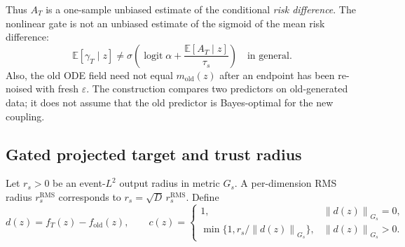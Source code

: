 \documentclass[11pt,a4paper]{article}
\newcommand{\E}{\mathbb{E}}
\newcommand{\norm}[1]{\left\lVert #1 \right\rVert}
\DeclareMathOperator{\logit}{logit}
\theoremstyle{plain}
\theoremstyle{definition}
\begin{document}
Thus $A_T$ is a one-sample unbiased estimate of the conditional \emph{risk difference}.  The
nonlinear gate is not an unbiased estimate of the sigmoid of the mean risk difference:
\begin{equation}
\E[\gamma_T\mid z]
\neq
\sigma\!\left(
  \logit\alpha+\frac{\E[A_T\mid z]}{\tau_s}
\right)
\quad\text{in general}.
\label{eq:a2-sigmoid-bias}
\end{equation}
Also, the old ODE field need not equal $m_{\mathrm{old}}(z)$ after an endpoint has been re-noised
with fresh $\varepsilon$.  The construction compares two predictors on old-generated data; it
does not assume that the old predictor is Bayes-optimal for the new coupling.

\subsection{Gated projected target and trust radius}

Let $r_s>0$ be an event-$L^2$ output radius in metric $G_s$.  A per-dimension RMS radius
$r_s^{\mathrm{RMS}}$ corresponds to $r_s=\sqrt D\,r_s^{\mathrm{RMS}}$.  Define
\begin{equation}
d(z)=f_T(z)-f_{\mathrm{old}}(z),
\qquad
c(z)=
\begin{cases}
1, & \norm{d(z)}_{G_s}=0,\\
\min\{1,r_s/\norm{d(z)}_{G_s}\}, & \norm{d(z)}_{G_s}>0.
\end{cases}
\label{eq:a2-projection-coef}
\end{equation}
\end{document}
